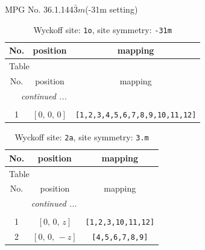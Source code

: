 \documentclass[fleqn,8pt]{jsarticle}
\begin{document}
\setcounter{MaxMatrixCols}{32}

\renewcommand{\tablename}{Table~}
\renewcommand{\figurename}{Figure~}
\begin{center}
\LARGE
MPG No. 36.1.144\quad$\bar{3}m$\quad(-31m setting)
\end{center}
\renewcommand{\arraystretch}{1.2}
\begin{longtable}{ccc}
\caption{Wyckoff site: {\tt 1o}, site symmetry: {\tt -31m}}
 \\
 \hline \hline
No. & position & mapping \\ \hline \endfirsthead

\multicolumn{2}{l}{\tablename\ \thetable{}} \\
 \hline \hline
No. & position & mapping \\ \hline \endhead

 \hline \hline
\multicolumn{2}{r}{\footnotesize\it continued ...} \\ \endfoot

 \hline \hline
\multicolumn{2}{r}{} \\ \endlastfoot

1 & $\left[ 0,\, 0,\, 0 \right]$ & {\tt [1,2,3,4,5,6,7,8,9,10,11,12]} \\
\end{longtable}
\renewcommand{\arraystretch}{1.2}
\begin{longtable}{ccc}
\caption{Wyckoff site: {\tt 2a}, site symmetry: {\tt 3.m}}
 \\
 \hline \hline
No. & position & mapping \\ \hline \endfirsthead

\multicolumn{2}{l}{\tablename\ \thetable{}} \\
 \hline \hline
No. & position & mapping \\ \hline \endhead

 \hline \hline
\multicolumn{2}{r}{\footnotesize\it continued ...} \\ \endfoot

 \hline \hline
\multicolumn{2}{r}{} \\ \endlastfoot

1 & $\left[ 0,\, 0,\, z \right]$ & {\tt [1,2,3,10,11,12]} \\ \hline
2 & $\left[ 0,\, 0,\, - z \right]$ & {\tt [4,5,6,7,8,9]} \\
\end{longtable}
\renewcommand{\arraystretch}{1.2}
\end{document}

